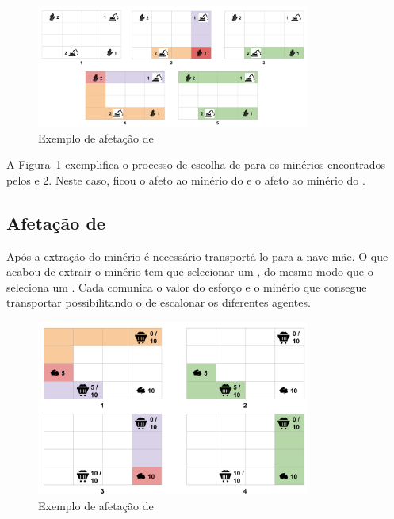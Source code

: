\documentclass[12pt]{report}
\begin{document}
\begin{figure}[h]
	\centering
    \includegraphics[width=0.8\textwidth]{producer-scheduling}
	\caption{Exemplo de afetação de \producers}
	\label{producer-scheduling}
\end{figure}

A Figura~\ref{producer-scheduling} exemplifica o processo de escolha de \producers para os minérios encontrados pelos  e 2. 
Neste caso, ficou o  afeto ao minério do  e o  afeto ao minério do .

\FloatBarrier
\subsection{Afetação de \transporters}
Após a extração do minério é necessário transportá-lo para a nave-mãe. 
O \producer que acabou de extrair o minério tem que selecionar um \transporter, do mesmo modo que o \spotter seleciona um \producer. 
Cada \transporter comunica o valor do esforço e o minério que consegue transportar possibilitando o \producer de escalonar os diferentes agentes.

\begin{figure}[h]
	\centering
    \includegraphics[width=0.8\textwidth]{transporter-scheduling}
	\caption{Exemplo de afetação de \transporters}
	\label{transporter-scheduling}
\end{figure}
\end{document}
